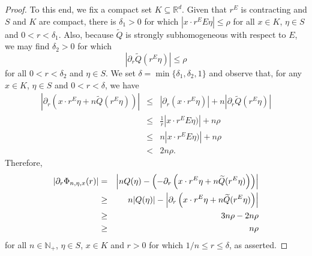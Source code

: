 \documentclass[11pt]{article}
\theoremstyle{remark}
\begin{document}
\begin{proof}
To this end, we fix a compact set $K\subseteq\mathbb{R}^d$. Given that $r^E$ is contracting and $S$ and $K$ are compact, there is $\delta_1>0$ for which $|x\cdot r^E E\eta|\leq \rho$ for all $x\in K$, $\eta\in S$ and $0<r<\delta_1$. Also, because $\widetilde{Q}$ is strongly subhomogeneous with respect to $E$, we may find $\delta_2>0$ for which
\begin{equation*}
    |\partial_r\widetilde{Q}(r^E\eta)|\leq \rho
\end{equation*}
for all $0<r<\delta_2$ and $\eta\in S$. We set $\delta=\min\{\delta_1,\delta_2,1\}$ and observe that, for any $x\in K$, $\eta\in S$ and $0<r<\delta$, we have
\begin{eqnarray*}
\left|\partial_r
\left(x\cdot r^E\eta
+n\widetilde{Q}
(r^E\eta)\right)
\right|
&\leq &
\left|\partial_r\left(x\cdot r^E\eta\right)\right|+n\left|
\partial_r\widetilde{Q}(r^E\eta)
\right|\\
&\leq&\frac{1}{r}|x\cdot r^E E\eta)|+n\rho\\
&\leq& n|x\cdot r^E E\eta)|+n\rho\\
&<&2n\rho.
\end{eqnarray*}
Therefore,
\begin{eqnarray*}
\abs{\partial_r\Phi_{n,\eta,x}(r)}&=&\abs{nQ(\eta)- \left(-\partial_r\left(x\cdot r^E\eta+n\widetilde{Q}(r^E\eta)\right)\right)}\\
&\geq& n|Q(\eta)|-\left|\partial_r
\left(x\cdot r^E\eta
+n\widetilde{Q}
(r^E\eta)\right)
\right|\\
&\geq& 3n\rho-2n\rho\\
&\geq &n\rho
\end{eqnarray*}
for all $n\in\mathbb{N}_+$, $\eta\in S$, $x\in K$ and $r>0$ for which $1/n\leq r\leq \delta$, as asserted.
\end{proof}
\end{document}

